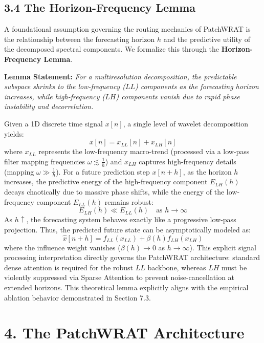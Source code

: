 \documentclass[11pt, letterpaper]{article}
\begin{document}
\subsection{3.4 The Horizon-Frequency Lemma}
A foundational assumption governing the routing mechanics of PatchWRAT is the relationship between the forecasting horizon $h$ and the predictive utility of the decomposed spectral components. We formalize this through the \textbf{Horizon-Frequency Lemma}.

\textbf{Lemma Statement:} \textit{For a multiresolution decomposition, the predictable subspace shrinks to the low-frequency ($LL$) components as the forecasting horizon increases, while high-frequency ($LH$) components vanish due to rapid phase instability and decorrelation.}

Given a 1D discrete time signal $x[n]$, a single level of wavelet decomposition yields:
\begin{equation}
    x[n] = x_{LL}[n] + x_{LH}[n]
\end{equation}
where $x_{LL}$ represents the low-frequency macro-trend (processed via a low-pass filter mapping frequencies $\omega \lesssim \frac{1}{h}$) and $x_{LH}$ captures high-frequency details (mapping $\omega \gg \frac{1}{h}$). For a future prediction step $x[n+h]$, as the horizon $h$ increases, the predictive energy of the high-frequency component $E_{LH}(h)$ decays chaotically due to massive phase shifts, while the energy of the low-frequency component $E_{LL}(h)$ remains robust:
\begin{equation}
    E_{LH}(h) \ll E_{LL}(h) \quad \text{as } h \to \infty
\end{equation}
As $h \uparrow$, the forecasting system behaves exactly like a progressive low-pass projection. Thus, the predicted future state can be asymptotically modeled as:
\begin{equation}
    \hat{x}[n+h] = f_{LL}(x_{LL}) + \beta(h) f_{LH}(x_{LH})
\end{equation}
where the influence weight vanishes ($\beta(h) \to 0$ as $h \to \infty$). This explicit signal processing interpretation directly governs the PatchWRAT architecture: standard dense attention is required for the robust $LL$ backbone, whereas $LH$ must be violently suppressed via Sparse Attention to prevent noise-cancellation at extended horizons. This theoretical lemma explicitly aligns with the empirical ablation behavior demonstrated in Section 7.3.


\section{4. The PatchWRAT Architecture}
\label{sec:architecture}
\end{document}
